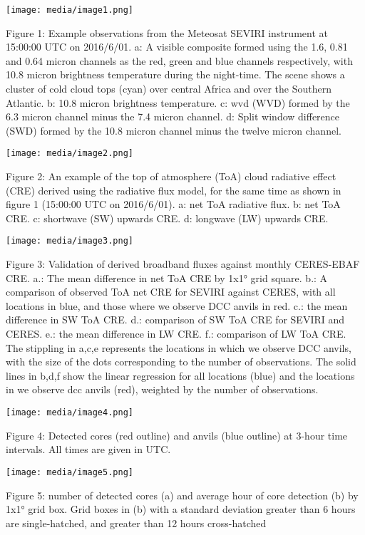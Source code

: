 \texttt{[image: media/image1.png]}

Figure 1: Example observations from the Meteosat SEVIRI instrument at
15:00:00 UTC on 2016/6/01. a: A visible composite formed using the 1.6,
0.81 and 0.64 micron channels as the red, green and blue channels
respectively, with 10.8 micron brightness temperature during the
night-time. The scene shows a cluster of cold cloud tops (cyan) over
central Africa and over the Southern Atlantic. b: 10.8 micron brightness
temperature. c: \acrshort{wvd} (WVD) formed by the 6.3 micron
channel minus the 7.4 micron channel. d: Split window difference (SWD)
formed by the 10.8 micron channel minus the twelve micron channel.

\texttt{[image: media/image2.png]}

Figure 2: An example of the top of atmosphere (ToA) cloud radiative
effect (CRE) derived using the radiative flux model, for the same time
as shown in figure 1 (15:00:00 UTC on 2016/6/01). a: net ToA radiative
flux. b: net ToA CRE. c: shortwave (SW) upwards CRE. d: longwave (LW)
upwards CRE.

\texttt{[image: media/image3.png]}

Figure 3: Validation of derived broadband fluxes against monthly
CERES-EBAF CRE. a.: The mean difference in net ToA CRE by 1x1° grid
square. b.: A comparison of observed ToA net CRE for SEVIRI against
CERES, with all locations in blue, and those where we observe DCC anvils
in red. c.: the mean difference in SW ToA CRE. d.: comparison of SW ToA
CRE for SEVIRI and CERES. e.: the mean difference in LW CRE. f.:
comparison of LW ToA CRE. The stippling in a,c,e represents the
locations in which we observe DCC anvils, with the size of the dots
corresponding to the number of observations. The solid lines in b,d,f
show the linear regression for all locations (blue) and the locations in
we observe dcc anvils (red), weighted by the number of observations.

\texttt{[image: media/image4.png]}

Figure 4: Detected cores (red outline) and anvils (blue outline) at
3-hour time intervals. All times are given in UTC.

\texttt{[image: media/image5.png]}

Figure 5: number of detected cores (a) and average hour of core
detection (b) by 1x1° grid box. Grid boxes in (b) with a standard
deviation greater than 6 hours are single-hatched, and greater than 12
hours cross-hatched

